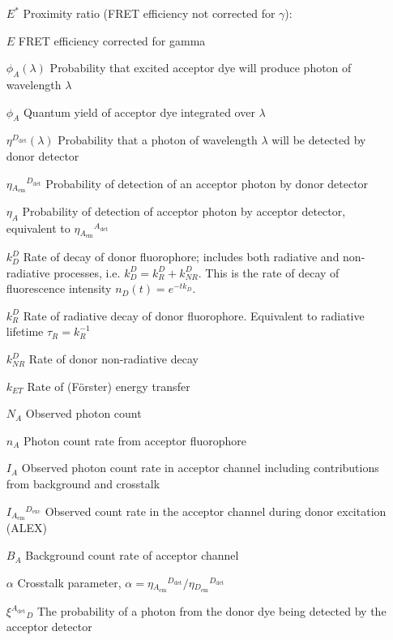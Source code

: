 \documentclass{article}
\newcommand{\emm}[1]{\ensuremath{_{#1_\mathrm{em}}}}   %
\newcommand{\exc}[1]{\ensuremath{^{#1_\mathrm{exc}}}}  %
\newcommand{\dt}[1]{\ensuremath{^{#1_\mathrm{det}}}}   %
\newcommand{\NR}{\ensuremath{\mathit{NR}}}          %
\newcommand{\ET}{\ensuremath{\mathit{ET}}}          %
\begin{document}
\begin{enumerate}
\item[$E^*$] Proximity ratio (FRET efficiency not corrected for $\gamma$):
\item[$E$] FRET efficiency corrected for gamma
\item[$\phi_{A}(\lambda)$] Probability that excited acceptor dye will produce photon of wavelength $\lambda$
\item[$\phi_{A}$] Quantum yield of acceptor dye integrated over $\lambda$
\item[$\eta\dt{D}(\lambda)$] Probability that a photon of wavelength $\lambda$ will be detected by donor detector
\item[$\eta\emm{A}\dt{D}$] Probability of detection of an acceptor photon by donor detector
\item[$\eta_A$] Probability of detection of acceptor photon by acceptor detector, equivalent to $\eta\emm{A}\dt{A}$
\item[$k^D_D$] Rate of decay of donor fluorophore; includes both radiative and non-radiative processes, i.e. $k^D_D = k^D_R + k^D_\NR$. This is the rate of decay of fluorescence intensity $n_D(t) = e^{-t k_D}$.
\item[$k^D_R$] Rate of radiative decay of donor fluorophore. Equivalent to radiative lifetime $\tau_R = k_R^{-1}$
\item[$k^D_\NR$] Rate of donor non-radiative decay
\item[$k_\ET$] Rate of (F\"orster) energy transfer
\item[$N_A$] Observed photon count
\item[$n_A$] Photon count rate from acceptor fluorophore
\item[$I_A$] Observed photon count rate in acceptor channel including contributions from background and crosstalk
\item[$I\emm{A}\exc{D}$] Observed count rate in the acceptor channel during donor excitation (ALEX)
\item[$B_A$] Background count rate of acceptor channel
\item[$\alpha$] Crosstalk parameter, $\alpha = \eta\emm{A}\dt{D} / \eta\emm{D}\dt{D}$
\item[$\xi\dt{A}_D$] The probability of a photon from the donor dye being detected by the acceptor detector
\end{enumerate}
\end{document}
